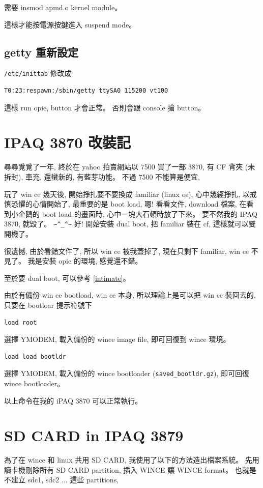 \documentclass[12pt,a4paper]{article}
\begin{document}
\begin{CJK}{UTF8}{cwmu}
需要 insmod apmd.o kernel module。

這樣才能按電源按鍵進入 suspend mode。

\subsection{getty 重新設定}
\verb+/etc/inittab+
修改成
\begin{verbatim}
T0:23:respawn:/sbin/getty ttySA0 115200 vt100
\end{verbatim}
這樣 run opie, button 才會正常。
否則會跟 console 搶 button。


\section{IPAQ 3870 改裝記}

尋尋覓覓了一年, 終於在 yahoo 拍賣網站以 7500 買了一部 3870,
有 CF 背夾 (未拆封), 車充, 還蠻新的, 
有藍芽功能。
不過 7500 不能算是便宜,

玩了 win ce 幾天後, 開始掙扎要不要換成 familiar (linux os),
心中幾經掙扎, 以戒慎恐懼的心情開始了,
最重要的是 boot load, 嗯! 看看文件, download 檔案,
在看到小企鵝的 boot load 的畫面時, 心中一塊大石頓時放了下來。
要不然我的 IPAQ 3870, 就毀了。 \verb+~^_^~+
好! 開始安裝 dual boot, 把 familiar 裝在 cf,
這樣就可以雙開機了。

很遺憾, 由於看錯文件了, 所以 win ce 被我蓋掉了,
現在只剩下 familiar, win ce 不見了。 我是安裝 opie 的環境,
感覺還不錯。

至於要 dual boot,
可以參考 \ref{intimate}。

由於有備份 win ce bootload, win ce 本身, 所以理論上是可以把
win ce 裝回去的, 只要在 bootloar 提示符號下
\begin{verbatim}
load root
\end{verbatim}
選擇 YMODEM, 載入備份的 wince image file, 即可回復到 
wince 環境。

\begin{verbatim}
load load bootldr
\end{verbatim}
選擇 YMODEM, 載入備份的 wince bootloader (\verb+saved_bootldr.gz+),
即可回復 wince bootloader。

以上命令在我的 iPAQ 3870 可以正常執行。

\section{SD CARD in IPAQ 3879}
為了在 wince 和 linux 共用 SD CARD,
我使用了以下的方法造出檔案系統。
先用讀卡機刪除所有 SD CARD partition,
插入 WINCE 讓 WINCE format。
也就是不建立 sdc1, sdc2 ... 這些 partitions,



\end{CJK}
\end{document}
